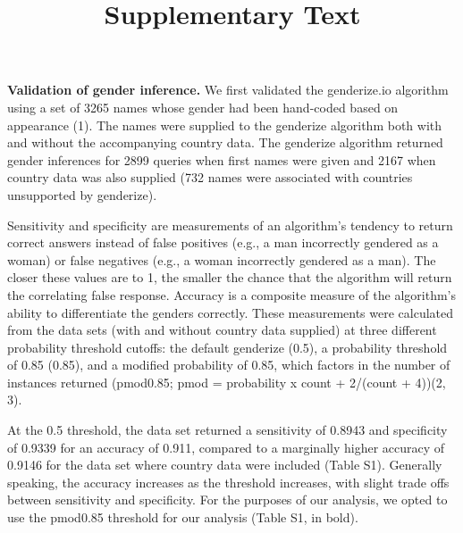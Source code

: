 \documentclass[11pt,]{article}
\title{Supplementary Text}
\author{}
\date{}
\begin{document}
\maketitle

\textbf{Validation of gender inference.} We first validated the
genderize.io algorithm using a set of 3265 names whose gender had been
hand-coded based on appearance (1). The names were supplied to the
genderize algorithm both with and without the accompanying country data.
The genderize algorithm returned gender inferences for 2899 queries when
first names were given and 2167 when country data was also supplied (732
names were associated with countries unsupported by genderize).

Sensitivity and specificity are measurements of an algorithm's tendency
to return correct answers instead of false positives (e.g., a man
incorrectly gendered as a woman) or false negatives (e.g., a woman
incorrectly gendered as a man). The closer these values are to 1, the
smaller the chance that the algorithm will return the correlating false
response. Accuracy is a composite measure of the algorithm's ability to
differentiate the genders correctly. These measurements were calculated
from the data sets (with and without country data supplied) at three
different probability threshold cutoffs: the default genderize (0.5), a
probability threshold of 0.85 (0.85), and a modified probability of
0.85, which factors in the number of instances returned (pmod0.85; pmod
= probability x count + 2/(count + 4))(2, 3).

At the 0.5 threshold, the data set returned a sensitivity of 0.8943 and
specificity of 0.9339 for an accuracy of 0.911, compared to a marginally
higher accuracy of 0.9146 for the data set where country data were
included (Table S1). Generally speaking, the accuracy increases as the
threshold increases, with slight trade offs between sensitivity and
specificity. For the purposes of our analysis, we opted to use the
pmod0.85 threshold for our analysis (Table S1, in bold).
\end{document}
